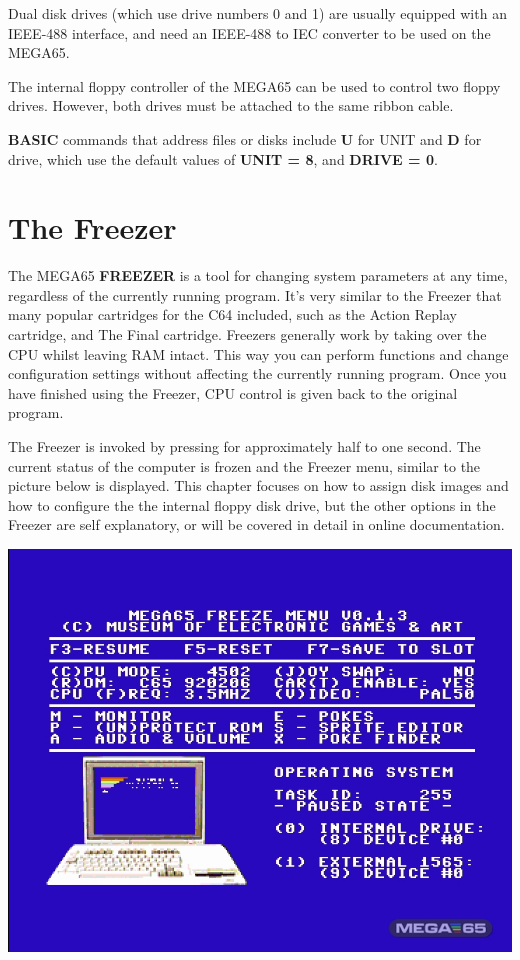 Dual disk drives (which use drive numbers 0 and 1) are usually equipped with an IEEE-488 interface, and need
an IEEE-488 to IEC converter to be used on the MEGA65.

The internal floppy controller of the MEGA65 can be used to control
two floppy drives. However, both drives must be attached to the same ribbon cable.

{\bf BASIC} commands that address files or disks include
{\bf U} for UNIT and {\bf D} for drive, which use the default values of
{\bf UNIT = 8}, and {\bf DRIVE = 0}.

\section{The Freezer}
The MEGA65 {\bf FREEZER} is a tool for changing system parameters at any time,
regardless of the currently running program. It's very similar to the Freezer that many popular cartridges
for the C64 included, such as the Action Replay cartridge, and The Final cartridge. Freezers generally work by
taking over the CPU whilst leaving RAM intact. This way you can perform functions and change configuration
settings without affecting the currently running program. Once you have finished using the Freezer, CPU control
is given back to the original program.


The Freezer is invoked by pressing  for approximately half to one second.
The current status of the computer is frozen and the Freezer menu,
similar to the picture below is displayed. This chapter focuses on how to assign disk images and how to configure the
the internal floppy disk drive, but the other options in the Freezer are self explanatory, or will be covered in detail in
online documentation.

\begin{center}
\includegraphics[trim= 10mm 20mm 10mm 20mm,clip,width=0.7\linewidth]{images/freezer.jpg}
\end{center}

